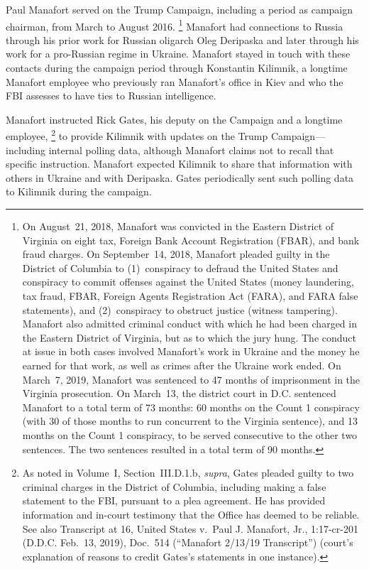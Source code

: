 Paul Manafort served on the Trump Campaign, including a period as campaign chairman, from March to August 2016.%
\footnote{On August~21, 2018, Manafort was convicted in the Eastern District of Virginia on eight tax, Foreign Bank Account Registration (FBAR), and bank fraud charges. On September~14, 2018, Manafort pleaded guilty in the District of Columbia to (1)~conspiracy to defraud the United States and conspiracy to commit offenses against the United States (money laundering, tax fraud, FBAR, Foreign Agents Registration Act (FARA), and FARA false statements), and (2)~conspiracy to obstruct justice (witness tampering).
Manafort also admitted criminal conduct with which he had been charged in the Eastern District of Virginia, but as to which the jury hung.
The conduct at issue in both cases involved Manafort's work in Ukraine and the money he earned for that work, as well as crimes after the Ukraine work ended. On March~7, 2019, Manafort was sentenced to 47 months of imprisonment in the Virginia prosecution.
On March~13, the district court in D.C. sentenced Manafort to a total term of 73 months: 60 months on the Count 1 conspiracy (with 30 of those months to run concurrent to the Virginia sentence), and 13 months on the Count 1 conspiracy, to be served consecutive to the other two sentences.
The two sentences resulted in a total term of 90 months.
}
Manafort had connections to Russia through his prior work for Russian oligarch Oleg Deripaska and later through his work for a pro-Russian regime in Ukraine.
Manafort stayed in touch with these contacts during the campaign period through Konstantin Kilimnik, a longtime Manafort employee who previously ran Manafort's office in Kiev and who the FBI assesses to have ties to Russian intelligence.

Manafort instructed Rick Gates, his deputy on the Campaign and a longtime employee,%
\footnote{As noted in Volume~I, Section~III.D.1.b, \textit{supra}, Gates pleaded guilty to two criminal charges in the District of Columbia, including making a false statement to the FBI, pursuant to a plea agreement.
He has provided information and in-court testimony that the Office has deemed to be reliable. See also Transcript at 16, United States v.\ Paul J. Manafort, Jr., 1:17-cr-201 (D.D.C. Feb.~13, 2019), Doc.~514 (“Manafort 2/13/19 Transcript”) (court's explanation of reasons to credit Gates's statements in one instance).}
to provide Kilimnik with updates on the Trump Campaign---including internal polling data, although Manafort claims not to recall that specific instruction.
Manafort expected Kilimnik to share that information with others in Ukraine and with Deripaska.
Gates periodically sent such polling data to Kilimnik during the campaign.

